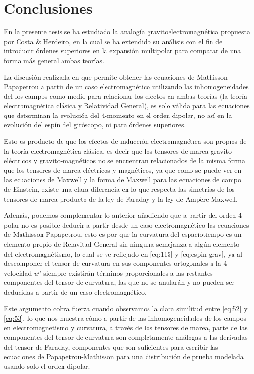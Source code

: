 \chapter{Conclusiones}

En la presente tesis se ha estudiado la analogía gravitoelectromagnética propuesta por Costa \& Herdeiro, en la cual se ha extendido su análisis con el fin de introducir órdenes superiores en la expansión multipolar para comparar de una forma más general ambas teorías.

La discusión realizada en \cite{Costa-Herdeiro} que permite obtener las ecuaciones de Mathisson-Papapetrou a partir de un caso electromagnético utilizando las inhomogeneidades del los campos como medio para relacionar los efectos en ambas teorías (la teoría electromagnética clásica y Relatividad General), es solo válida para las ecuaciones que determinan la evolución del 4-momento en el orden dipolar, no así en la evolución del espín del giróscopo, ni para órdenes superiores.

Esto es producto de que los efectos de inducción electromagnética son propios de la teoría electromagnética clásica, es decir que los tensores de marea gravito-eléctricos y gravito-magnéticos no se encuentran relacionados de la misma forma que los tensores de marea eléctricos y magnéticos, ya que como se puede ver en las ecuaciones de Maxwell y la forma de Maxwell para las ecuaciones de campo de Einstein, existe una clara diferencia en lo que respecta las simetrías de los tensores de marea producto de la ley de Faraday y la ley de Amp$\grave{\mathrm{e}}$re-Maxwell.

Además, podemos complementar lo anterior añadiendo que a partir del orden 4-polar no es posible deducir a partir desde un caso electromagnético las ecuaciones de Mathisson-Papapetrou, esto es por que la curvatura del espaciotiempo es un elemento propio de Relavitad General sin ninguna semejanza a algún elemento del electromagnétismo, lo cual se ve reflejado en \eqref{eq:115} y \eqref{eq:espin-grav}, ya al descomponer el tensor de curvatura en sus componentes ortogonales a la 4-velocidad $u^{\mu}$ siempre existirán términos proporcionales a las restantes componentes del tensor de curvatura, las que no se anularán y no pueden ser deducidas a partir de un caso electromagnético.

Este argumento cobra fuerza cuando observamos la clara similitud entre \eqref{eq:52} y \eqref{eq:53}, lo que nos muestra cómo a partir de las inhomogeneidades de los campos en electromagnetismo y curvatura, a través de los tensores de marea, parte de las componentes del tensor de curvatura son completamente análogas a las derivadas del tensor de Faraday, componentes que son suficientes para escribir las ecuaciones de Papapetrou-Mathisson para una distribución de prueba modelada usando solo el orden dipolar.